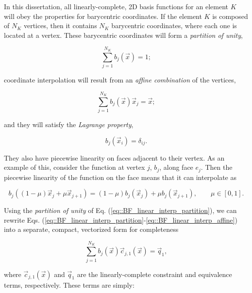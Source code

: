 In this dissertation, all linearly-complete, 2D basis functions for an element $K$ will obey the properties for barycentric coordinates. If the element $K$ is composed of $N_K$ vertices, then it contains $N_K$ barycentric coordinates, where each one is located at a vertex. These barycentric coordinates will form a {\em partition of unity},

\begin{equation}
\sum_{j=1}^{N_K} b_j (\vec{x})  =  1;
\label{eq::BF_linear_interp_partition}
\end{equation}

\noindent coordinate interpolation will result from an {\em affine combination} of the vertices,

\begin{equation}
\sum_{j=1}^{N_K} b_j (\vec{x}) \vec{x}_j  =  \vec{x};
\label{eq::BF_linear_interp_affine}
\end{equation}

\noindent and they will satisfy the {\em Lagrange property},

\begin{equation}
b_j (\vec{x}_i) = \delta_{ij}.
\label{eq::BF_linear_interp_lagrange}
\end{equation}

\noindent They also have piecewise linearity on faces adjacent to their vertex. As an example of this, consider the function at vertex $j$, $b_j$, along face $e_j$. Then the piecewise linearity of the function on the face means that it can interpolate as

\begin{equation}
\label{eq::BF_linear_bound_interp}
b_j ((1-\mu ) \vec{x}_j  + \mu \vec{x}_{j+1})  = (1-\mu ) b_j (\vec{x}_j ) + \mu b_j (\vec{x}_{j+1} ) , \qquad \mu \in [0,1].
\end{equation}

Using the {\em partition of unity} of Eq. (\ref{eq::BF_linear_interp_partition}), we can rewrite Eqs. (\ref{eq::BF_linear_interp_partition}-\ref{eq::BF_linear_interp_affine}) into a separate, compact, vectorized form for completeness

\begin{equation}
\sum_{j=1}^{N_K}  b_j (\vec{x}) \vec{c}_{j,1}(\vec{x}) = \vec{q}_1 ,
\label{eq::BF_linear_interp_req_vector}
\end{equation}

\noindent where $\vec{c}_{j,1}(\vec{x})$ and $\vec{q}_1$ are the linearly-complete constraint and equivalence terms, respectively. These terms are simply:

